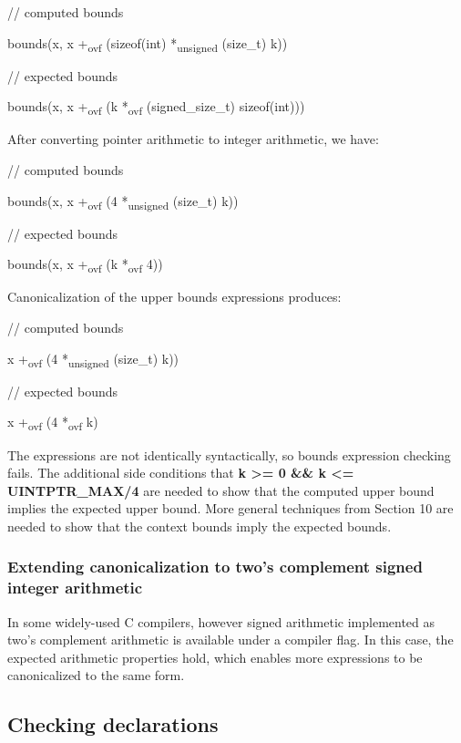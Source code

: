 \documentclass[]{article}
\begin{document}
// computed bounds

bounds(x, x +\textsubscript{ovf} (sizeof(int) *\textsubscript{unsigned}
(size\_t) k))

// expected bounds

bounds(x, x +\textsubscript{ovf} (k *\textsubscript{ovf}
(signed\_size\_t) sizeof(int)))

After converting pointer arithmetic to integer arithmetic, we have:

// computed bounds

bounds(x, x +\textsubscript{ovf} (4 *\textsubscript{unsigned} (size\_t)
k))

// expected bounds

bounds(x, x +\textsubscript{ovf} (k *\textsubscript{ovf} 4))

Canonicalization of the upper bounds expressions produces:

// computed bounds

x +\textsubscript{ovf} (4 *\textsubscript{unsigned} (size\_t) k))

// expected bounds

x +\textsubscript{ovf} (4 *\textsubscript{ovf} k)

The expressions are not identically syntactically, so bounds expression
checking fails. The additional side conditions that \textbf{k
\textgreater{}= 0 \&\& k \textless{}= UINTPTR\_MAX/4} are needed to show
that the computed upper bound implies the expected upper bound. More
general techniques from Section 10 are needed to show that the context
bounds imply the expected bounds.

\subsubsection{\texorpdfstring{\protect\hypertarget{ux5fToc440445469}{}{\protect\hypertarget{ux5fToc440449251}{}{\protect\hypertarget{ux5fToc440551901}{}{}}}Extending
canonicalization to two's complement signed integer
arithmetic}{Extending canonicalization to two's complement signed integer arithmetic}}\label{extending-canonicalization-to-twos-complement-signed-integer-arithmetic}

In some widely-used C compilers, however signed arithmetic implemented
as two's complement arithmetic is available under a compiler flag. In
this case, the expected arithmetic properties hold, which enables more
expressions to be canonicalized to the same form.

\subsection{\texorpdfstring{\protect\hypertarget{ux5fRef426635977}{}{\protect\hypertarget{ux5fToc426641086}{}{\protect\hypertarget{ux5fToc435434961}{}{\protect\hypertarget{ux5fToc437460789}{}{\protect\hypertarget{ux5fToc440445470}{}{\protect\hypertarget{ux5fToc440449252}{}{\protect\hypertarget{ux5fToc440551902}{}{}}}}}}}Checking
declarations}{Checking declarations}}\label{checking-declarations}
\end{document}
